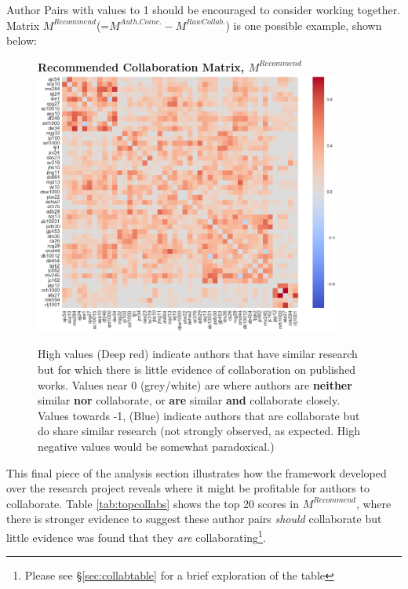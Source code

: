 Author Pairs with values to 1 should be encouraged to consider working together. Matrix $M^{Recommend}$(=$M^{Auth. Coinc.}-M^{Raw Collab.}$) is one possible example, shown below:
\begin{center}
\begin{figure}[H]
  \centering
  \textbf{Recommended Collaboration Matrix, $M^{Recommend}$}
    \includegraphics[width=0.9\textwidth]{Analysis/Recommending_Mat.png}
    \caption[Recommended Collaboration Matrix]{High values (Deep red) indicate authors that have similar research but for which there is little evidence of collaboration on published works. Values near 0 (grey/white) are where authors are \textbf{neither} similar \textbf{nor} collaborate, or \textbf{are} similar \textbf{and} collaborate closely. Values towards -1, (Blue) indicate authors that are collaborate but do share similar research (not strongly observed, as expected. High negative values would be somewhat paradoxical.) }
    \label{fig:RECOMM_MAT}
\end{figure} 
\end{center}
This final piece of the analysis section illustrates how the framework developed over the research project reveals where it might be profitable for authors to collaborate. Table \ref{tab:topcollabs} shows the top 20 scores in $M^{Recommend}$, where there is stronger evidence to suggest these author pairs \emph{should} collaborate but little evidence was found that they \emph{are} collaborating\footnote{Please see \S\ref{sec:collabtable} for a brief exploration of the table}.
